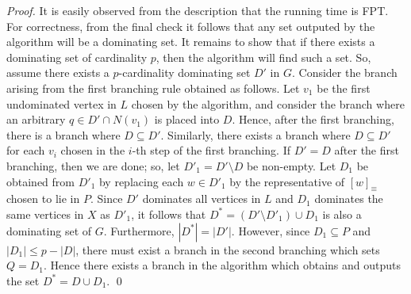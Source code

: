 \documentclass{llncs}
\begin{document}
{\begin{proof}
It is easily observed from the description that the running time is FPT. For correctness, from the final check it follows that any set outputed by the algorithm will be a dominating set. It remains to show that if there exists a dominating set of cardinality $p$, then the algorithm will find such a set. So, assume there exists a $p$-cardinality dominating set $D'$ in $G$. Consider the branch arising from the first branching rule obtained as follows. Let $v_1$ be the first undominated vertex in $L$ chosen by the algorithm, and consider the branch where an arbitrary $q\in D'\cap N(v_1)$ is placed into $D$. Hence, after the first branching, there is a branch where $D\subseteq D'$. Similarly, there exists a branch where $D\subseteq D'$ for each $v_i$ chosen in the $i$-th step of the first branching. If $D'=D$ after the first branching, then we are done; so, let $D'_1=D'\setminus D$ be non-empty. Let $D_1$ be obtained from $D'_1$ by replacing each $w\in D'_1$ by the representative of $[w]_\equiv$ chosen to lie in $P$. Since $D'$ dominates all vertices in $L$ and $D_1$ dominates the same vertices in $X$ as $D'_1$, it follows that $D^*=(D'\setminus D'_1)\cup D_1$ is also a dominating set of $G$. Furthermore, $|D^*|=|D'|$. However, since $D_1\subseteq P$ and $|D_1|\leq p-|D|$, there must exist a branch in the second branching which sets $Q=D_1$. Hence there exists a branch in the algorithm which obtains and outputs the set $D^*=D\cup D_1$.
\qed
\end{proof}}

\lv{\lemdomfpt}
\end{document}
